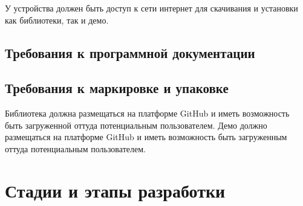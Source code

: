 \documentclass{../TechDoc}
\begin{document}
    У устройства должен быть доступ к сети интернет для скачивания и установки как библиотеки, так и демо.

    \subsection{Требования к программной документации}

        

    \subsection{Требования к маркировке и упаковке}
    
    Библиотека должна размещаться на платформе GitHub и иметь возможность быть загруженной оттуда потенциальным пользователем.
    Демо должно размещаться на платформе GitHub и иметь возможность быть загруженным оттуда потенциальным пользователем.

    \section{Стадии и этапы разработки}
    
\end{document}
